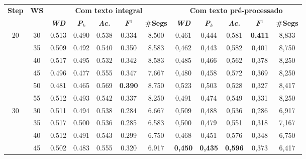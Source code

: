 



\begin{table}[!h]
\tiny 
	\begin{tabular}{|c|c||c|c|c|c|c||c|c|c|c|c|}
\hline 
\multirow{2}{*}{\textbf{Step}} & \multirow{2}{*}{\textbf{WS}}
																				  & \multicolumn{5}{c||}{\textbf{Com texto integral}} & \multicolumn{5}{c|}{\textbf{Com texto pré-processado}}\\\cline{3-12} 
																			   && \textit{\textbf{WD}} & \textbf{\textit{P}}$_k$ & \textit{\textbf{Ac.}} & \textbf{\textit{F}}$^1$ & \textbf{\#Segs} &  \textit{\textbf{WD}} & \textbf{\textit{P}}$_k$ & \textit{\textbf{Ac.}} & \textbf{\textit{F}}$^1$ & \textbf{\#Segs}\\ \hline 
 \multirow{6}{*}{20} 
  & 30 & 0.513 & 0.490 & 0.538 & 0.334  & 8.500                 & 0,461 & 0,444 & 0,581 & \cellcolor{gray!20} \textbf{0,411} & 8,833  \\ \cline{2-12} 
  & 35 & 0.509 & 0.492 & 0.540 & 0.350  & 8.583                 & 0,462 & 0,443 & 0,582 & 0,401 & 8,750  \\  \cline{2-12}
  & 40 & 0.517 & 0.495 & 0.532 & 0.342  & 8.583                 & 0,485 & 0,466 & 0,562 & 0,378 & 8,250  \\  \cline{2-12}
  & 45 & 0.496 & 0.477 & 0.555 & 0.347  & 7.667                 & 0,480 & 0,458 & 0,572 & 0,369 & 8,250  \\  \cline{2-12}
  & 50 & 0.481 & 0.465 & 0.569 & \cellcolor{gray!20} \textbf{0.390} & 8.750  & 0,523 & 0,503 & 0,528 & 0,327 & 8,417  \\  \cline{2-12}
  & 55 & 0.512 & 0.493 & 0.542 & 0.337  & 8.250  & 0,491 & 0,474 & 0,549 & 0,331 & 8,250  \\ \hline      
 \multirow{6}{*}{30} 
  & 30 & 0.511 & 0.494 & 0.538 & 0.284  & 6.667                & 0,509 & 0,488 & 0,536 & 0,286 & 6,917  \\ \cline{2-12}    
  & 35 & 0.517 & 0.500 & 0.536 & 0.285  & 6.583                & 0,500 & 0,479 & 0,551 & 0,318 & 7,167  \\ \cline{2-12}         
  & 40 & 0.512 & 0.491 & 0.543 & 0.299  & 6.750                & 0,468 & 0,451 & 0,576 & 0,348 & 6,750  \\ \cline{2-12} 
  & 45 & 0.502 & 0.483 & 0.555 & 0.320  & 6.917                & \cellcolor{gray!20} \textbf{0,450} & \cellcolor{gray!20} \textbf{0,435} & \cellcolor{gray!20} \textbf{0,596} & 0,373 & 6,417  \\  \cline{2-12} 

\end{tabular}
\end{table}
